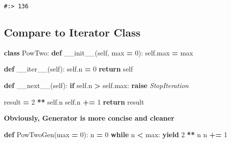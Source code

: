 \documentclass[
]{book}
\newenvironment{Shaded}{\begin{snugshade}}{\end{snugshade}}
\newcommand{\BuiltInTok}[1]{#1}
\newcommand{\ControlFlowTok}[1]{\textcolor[rgb]{0.27,0.27,0.27}{\textbf{#1}}}
\newcommand{\DecValTok}[1]{\textcolor[rgb]{0.06,0.06,0.06}{#1}}
\newcommand{\FunctionTok}[1]{\textcolor[rgb]{0,0,0}{#1}}
\newcommand{\KeywordTok}[1]{\textcolor[rgb]{0.27,0.27,0.27}{\textbf{#1}}}
\newcommand{\NormalTok}[1]{#1}
\newcommand{\OperatorTok}[1]{\textcolor[rgb]{0.43,0.43,0.43}{\textbf{#1}}}
\newcommand{\PreprocessorTok}[1]{\textcolor[rgb]{0.37,0.37,0.37}{\textit{#1}}}
\newcommand{\VariableTok}[1]{\textcolor[rgb]{0,0,0}{#1}}
\begin{document}
\begin{verbatim}
#:> 136
\end{verbatim}

\hypertarget{compare-to-iterator-class}{%
\subsection{Compare to Iterator Class}\label{compare-to-iterator-class}}

\begin{Shaded}
\begin{Highlighting}[]
\KeywordTok{class}\NormalTok{ PowTwo:}
    \KeywordTok{def} \FunctionTok{__init__}\NormalTok{(}\VariableTok{self}\NormalTok{, }\BuiltInTok{max} \OperatorTok{=} \DecValTok{0}\NormalTok{):}
        \VariableTok{self}\NormalTok{.}\BuiltInTok{max} \OperatorTok{=} \BuiltInTok{max}

    \KeywordTok{def} \FunctionTok{__iter__}\NormalTok{(}\VariableTok{self}\NormalTok{):}
        \VariableTok{self}\NormalTok{.n }\OperatorTok{=} \DecValTok{0}
        \ControlFlowTok{return} \VariableTok{self}

    \KeywordTok{def} \FunctionTok{__next__}\NormalTok{(}\VariableTok{self}\NormalTok{):}
        \ControlFlowTok{if} \VariableTok{self}\NormalTok{.n }\OperatorTok{>} \VariableTok{self}\NormalTok{.}\BuiltInTok{max}\NormalTok{:}
            \ControlFlowTok{raise} \PreprocessorTok{StopIteration}

\NormalTok{        result }\OperatorTok{=} \DecValTok{2} \OperatorTok{**} \VariableTok{self}\NormalTok{.n}
        \VariableTok{self}\NormalTok{.n }\OperatorTok{+=} \DecValTok{1}
        \ControlFlowTok{return}\NormalTok{ result}
\end{Highlighting}
\end{Shaded}

\textbf{Obviously, Generator is more concise and cleaner}

\begin{Shaded}
\begin{Highlighting}[]
\KeywordTok{def}\NormalTok{ PowTwoGen(}\BuiltInTok{max} \OperatorTok{=} \DecValTok{0}\NormalTok{):}
\NormalTok{    n }\OperatorTok{=} \DecValTok{0}
    \ControlFlowTok{while}\NormalTok{ n }\OperatorTok{<} \BuiltInTok{max}\NormalTok{:}
        \ControlFlowTok{yield} \DecValTok{2} \OperatorTok{**}\NormalTok{ n}
\NormalTok{        n }\OperatorTok{+=} \DecValTok{1}
\end{Highlighting}
\end{Shaded}
\end{document}
